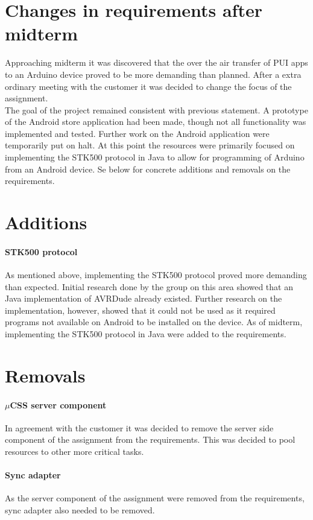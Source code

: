 \section{Changes in requirements after midterm}
Approaching midterm it was discovered that the over the air transfer of PUI apps to an Arduino device proved to be more demanding than planned. After a extra ordinary meeting with the customer it was decided to change the focus of the assignment. \\
\newline
The goal of the project remained consistent with previous statement. A prototype of the Android store application had been made, though not all functionality was implemented and tested. Further work on the Android application were temporarily put on halt. At this point the resources were primarily focused on implementing the STK500 protocol in Java to allow for programming of Arduino from an Android device. Se below for concrete additions and removals on the requirements.

\section{Additions}
\paragraph{STK500 protocol} As mentioned above, implementing the STK500 protocol proved more demanding than expected. Initial research done by the group on this area showed that an Java implementation of AVRDude already existed. Further research on the implementation, however, showed that it could not be used as it required programs not available on Android to be installed on the device. As of midterm, implementing the STK500 protocol in Java were added to the requirements.

\section{Removals}
\paragraph{$\mu$CSS server component} In agreement with the customer it was decided to remove the server side component of the assignment from the requirements. This was decided to pool resources to other more critical tasks.

\paragraph{Sync adapter} As the server component of the assignment were removed from the requirements, sync adapter also needed to be removed.

